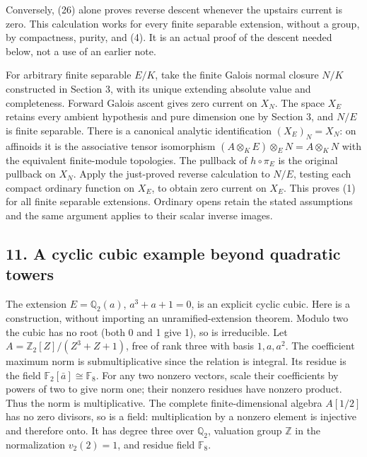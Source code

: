\documentclass[11pt]{article}
\begin{document}
Conversely, (26) alone proves reverse descent whenever the upstairs
current is zero. This calculation works for every finite separable
extension, without a group, by compactness, purity, and (4). It is an
actual proof of the descent needed below, not a use of an earlier note.

For arbitrary finite separable \(E/K\), take the finite Galois normal
closure \(N/K\) constructed in Section 3, with its unique extending
absolute value and completeness. Forward Galois ascent gives zero
current on \(X_N\). The space \(X_E\) retains every ambient hypothesis
and pure dimension one by Section 3, and \(N/E\) is finite separable.
There is a canonical analytic identification \((X_E)_N=X_N\): on
affinoids it is the associative tensor isomorphism
\((A\otimes_K E)\otimes_E N=A\otimes_K N\) with the equivalent
finite-module topologies. The pullback of \(h\circ\pi_E\) is the
original pullback on \(X_N\). Apply the just-proved reverse calculation
to \(N/E\), testing each compact ordinary function on \(X_E\), to obtain
zero current on \(X_E\). This proves (1) for all finite separable
extensions. Ordinary opens retain the stated assumptions and the same
argument applies to their scalar inverse images.

\subsection{11. A cyclic cubic example beyond quadratic
towers}\label{a-cyclic-cubic-example-beyond-quadratic-towers}

The extension \(E=\mathbb Q_2(a)\), \(a^3+a+1=0\), is an explicit cyclic
cubic. Here is a construction, without importing an unramified-extension
theorem. Modulo two the cubic has no root (both 0 and 1 give 1), so is
irreducible. Let \(A=\mathbb Z_2[Z]/(Z^3+Z+1)\), free of rank three with
basis \(1,a,a^2\). The coefficient maximum norm is submultiplicative
since the relation is integral. Its residue is the field
\(\mathbb F_2[\bar a]\cong\mathbb F_8\). For any two nonzero vectors,
scale their coefficients by powers of two to give norm one; their
nonzero residues have nonzero product. Thus the norm is multiplicative.
The complete finite-dimensional algebra \(A[1/2]\) has no zero divisors,
so is a field: multiplication by a nonzero element is injective and
therefore onto. It has degree three over \(\mathbb Q_2\), valuation
group \(\mathbb Z\) in the normalization \(v_2(2)=1\), and residue field
\(\mathbb F_8\).
\end{document}
